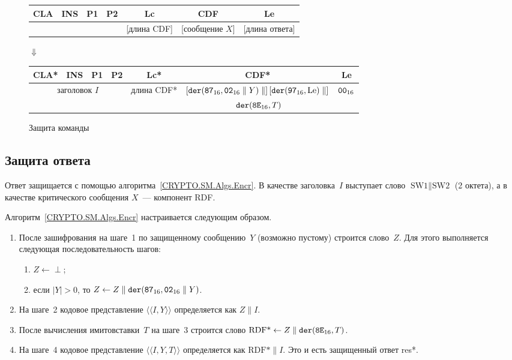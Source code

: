 \begin{figure}[!h]
\begin{center}
\begin{tabular}{|c|c|c|c|c|c|c|}
\hline
CLA & INS & P1 & P2 & Lc & CDF & Le \\
\hline
\hline
\multicolumn{4}{|c|}{} & [длина CDF] & [сообщение $X$] & [длина ответа]\\
\hline
\end{tabular}

\vskip3pt$\Downarrow$\vskip3pt

\begin{tabular}{|c|c|c|c|c|c|c|}
\hline
CLA* & INS & P1 & P2 & Lc* & CDF* & Le \\
\hline
\hline
\multicolumn{4}{|c|}{заголовок $I$} & длина CDF* & 
$\left[\texttt{der}(\texttt{87}_{16},\texttt{02}_{16}\parallel Y)\parallel\right]
\left[\texttt{der}(\texttt{97}_{16},\text{Le})\parallel\right]$ & $\texttt{00}_{16}$\\
\multicolumn{4}{|c|}{} & & 
$\phantom{[}\texttt{der}(\texttt{8E}_{16},T)$\hfill\mbox{} &\\
\hline
\end{tabular}
\end{center}
\caption{Защита команды}\label{Fig.CMDS.CmdEncr}
\end{figure}

\subsection{Защита ответа}\label{CMDS.SM.EncrRez}

Ответ защищается с помощью алгоритма~\ref{CRYPTO.SM.Algs.Encr}. 
В качестве заголовка~$I$ выступает слово $\text{SW1} \parallel\text{SW2}$ 
(2 октета), а в качестве критического сообщения $X$~--- компонент RDF. 

Алгоритм~\ref{CRYPTO.SM.Algs.Encr} настраивается следующим образом.
\begin{enumerate}
\item
После зашифрования на шаге~1 по защищенному сообщению~$Y$
(возможно пустому) строится слово~$Z$. Для этого выполняется следующая 
последовательность шагов:
\begin{enumerate}
\item
$Z\gets\perp$;
\item
если $|Y|>0$, то $Z\gets Z\parallel\texttt{der}(\texttt{87}_{16},\texttt{02}_{16}\parallel Y)$.
\end{enumerate}
\item
На шаге~2 кодовое представление $\langle\langle I,Y\rangle\rangle$
определяется как $Z\parallel I$.
\item
После вычисления имитовставки~$T$ на шаге~3 строится слово
$\text{RDF*}\gets Z\parallel \texttt{der}(\texttt{8E}_{16}, T)$.
\item
На шаге~4 кодовое представление $\langle\langle I,Y,T\rangle\rangle$
определяется как $\text{RDF*}\parallel I$.
Это и есть защищенный ответ res*.
\end{enumerate}

